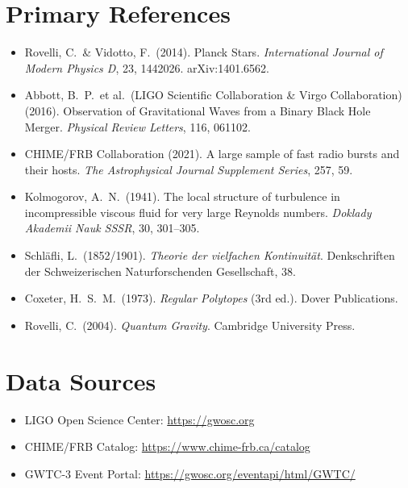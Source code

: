 \documentclass[11pt, letterpaper, openany]{book}
\begin{document}
\section*{Primary References}
\begin{itemize}
    \item Rovelli, C.\ \& Vidotto, F.\ (2014). Planck Stars. \textit{International Journal of Modern Physics D}, 23, 1442026. arXiv:1401.6562.
    \item Abbott, B.~P.\ et al.\ (LIGO Scientific Collaboration \& Virgo Collaboration) (2016). Observation of Gravitational Waves from a Binary Black Hole Merger. \textit{Physical Review Letters}, 116, 061102.
    \item CHIME/FRB Collaboration (2021). A large sample of fast radio bursts and their hosts. \textit{The Astrophysical Journal Supplement Series}, 257, 59.
    \item Kolmogorov, A.~N.\ (1941). The local structure of turbulence in incompressible viscous fluid for very large Reynolds numbers. \textit{Doklady Akademii Nauk SSSR}, 30, 301--305.
    \item Schläfli, L.\ (1852/1901). \textit{Theorie der vielfachen Kontinuität}. Denkschriften der Schweizerischen Naturforschenden Gesellschaft, 38.
    \item Coxeter, H.~S.~M.\ (1973). \textit{Regular Polytopes} (3rd ed.). Dover Publications.
    \item Rovelli, C.\ (2004). \textit{Quantum Gravity}. Cambridge University Press.
\end{itemize}

\section*{Data Sources}
\begin{itemize}
    \item LIGO Open Science Center: \url{https://gwosc.org}
    \item CHIME/FRB Catalog: \url{https://www.chime-frb.ca/catalog}
    \item GWTC-3 Event Portal: \url{https://gwosc.org/eventapi/html/GWTC/}
\end{itemize}
\end{document}
